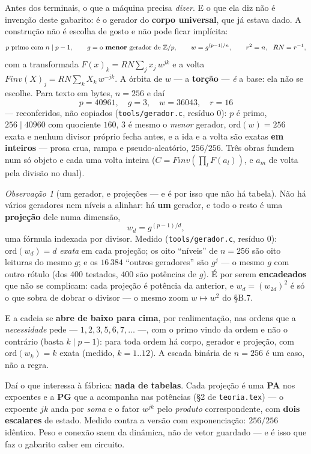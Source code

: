 \documentclass[11pt]{article}
\newcommand{\code}[1]{\texttt{\small #1}}
\theoremstyle{plain}
\theoremstyle{remark}
\newtheorem{observacao}[teorema]{Observação}
\begin{document}
Antes dos terminais, o que a máquina precisa \emph{dizer}. E o que ela diz não é invenção deste
gabarito: é o gerador do \textbf{corpo universal}, que já estava dado. A construção não é escolha de
gosto e não pode ficar implícita:
\[
 p\ \text{primo com } n\mid p-1,\qquad
 g=\text{o \textbf{menor} gerador de } \mathbb{Z}/p,\qquad
 w=g^{(p-1)/n},\qquad r^2=n,\ \ RN=r^{-1},
\]
com a transformada $F(x)_k=RN\sum_j x_j\,w^{jk}$ e a volta $Finv(X)_j=RN\sum_k X_k\,w^{-jk}$. A órbita
de $w$ --- a \textbf{torção} --- \emph{é} a base: ela não se escolhe. Para texto em bytes,
$n=256$ e daí
\[
 \boxed{p=40961,\quad g=3,\quad w=36043,\quad r=16}
\]
--- reconferidos, não copiados (\code{tools/gerador.c}, resíduo $0$): $p$ é primo, $256\mid40960$ com
quociente $160$, $3$ é mesmo o \emph{menor} gerador, $\mathrm{ord}(w)=256$ exata e nenhum divisor
próprio fecha antes, e a ida e a volta são exatas \textbf{em inteiros} --- prosa crua, rampa e
pseudo-aleatório, $256/256$. Três obras fundem num só objeto e cada uma volta inteira
($C=Finv(\prod_l F(a_l))$, e $a_m$ de volta pela divisão no dual).

\begin{observacao}[um gerador, e projeções --- e é por isso que não há tabela]
Não há vários geradores nem níveis a alinhar: há \textbf{um} gerador, e todo o resto é uma
\textbf{projeção} dele numa dimensão,
\[
 w_d = g^{(p-1)/d},
\]
uma fórmula indexada por divisor. Medido (\code{tools/gerador.c}, resíduo $0$): $\mathrm{ord}(w_d)=d$
\emph{exata} em cada projeção; os oito ``níveis'' de $n=256$ são oito leituras do mesmo $g$; e os
$16\,384$ ``outros geradores'' são $g^j$ --- o mesmo $g$ com outro rótulo (dos $400$ testados, $400$
são potências de $g$). É por serem \textbf{encadeados} que não se complicam: cada projeção é potência
da anterior, e $w_d=(w_{2d})^2$ é só o que sobra de dobrar o divisor --- o mesmo zoom $w\mapsto w^2$
do §B.7.

E a cadeia se \textbf{abre de baixo para cima}, por realimentação, nas ordens que a \emph{necessidade}
pede --- $1,2,3,5,6,7,\dots$ ---, com o primo vindo da ordem e não o contrário (basta $k\mid p-1$):
para toda ordem há corpo, gerador e projeção, com $\mathrm{ord}(w_k)=k$ exata (medido, $k=1..12$). A
escada binária de $n=256$ é um caso, não a regra.

Daí o que interessa à fábrica: \textbf{nada de tabelas}. Cada projeção é uma \textbf{PA} nos expoentes
e a \textbf{PG} que a acompanha nas potências (§2 de \texttt{teoria.tex}) --- o expoente $jk$ anda por
\emph{soma} e o fator $w^{jk}$ pelo \emph{produto} correspondente, com \textbf{dois escalares} de
estado. Medido contra a versão com exponenciação: $256/256$ idêntico. Peso e conexão saem da dinâmica,
não de vetor guardado --- e é isso que faz o gabarito caber em circuito.
\end{observacao}
\end{document}
